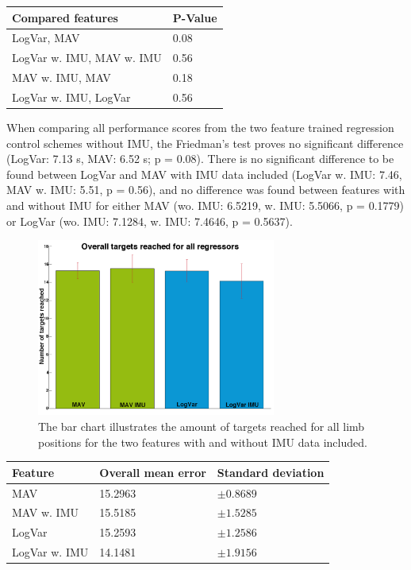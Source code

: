 \begin{center}
	\begin{tabular}{l l}
		\toprule
		\textbf{Compared features} & \textbf{P-Value}\\
		\midrule
		LogVar, MAV & 0.08 \\
		LogVar w. IMU, MAV w. IMU & 0.56 \\
		MAV w. IMU, MAV & 0.18 \\
		LogVar w. IMU, LogVar & 0.56 \\
		\bottomrule
	\end{tabular}
\end{center}

When comparing all performance scores from the two feature trained regression control schemes without IMU, the Friedman's test proves no significant difference (LogVar: 7.13 s, MAV: 6.52 s; p = 0.08). There is no significant difference to be found between LogVar and MAV with IMU data included (LogVar w. IMU: 7.46, MAV w. IMU: 5.51, p = 0.56), and no difference was found between features with and without IMU for either MAV (wo. IMU: 6.5219, w. IMU: 5.5066, p = 0.1779) or LogVar (wo. IMU: 7.1284, w. IMU: 7.4646, p = 0.5637).


\begin{figure}[H]
	\includegraphics[width=0.7\textwidth]{figures/results/sumMoreBarsWithTargetsReachedForAllRegressors}  %
	\caption{The bar chart illustrates the amount of targets reached for all limb positions for the two features with and without IMU data included.}
	\label{fig:TargetsReachedOverall}  %
\end{figure}

\begin{center}
	\begin{tabular}{l l l}
		\toprule
		\textbf{Feature} & \textbf{Overall mean error} & \textbf{Standard deviation}\\
		\midrule
		MAV & 15.2963 & $\pm 0.8689$ \\
		MAV w. IMU & 15.5185 & $\pm 1.5285$ \\
		LogVar & 15.2593 & $\pm 1.2586$ \\
		LogVar w. IMU & 14.1481 & $\pm 1.9156$ \\
		\bottomrule
	\end{tabular}
\end{center}

